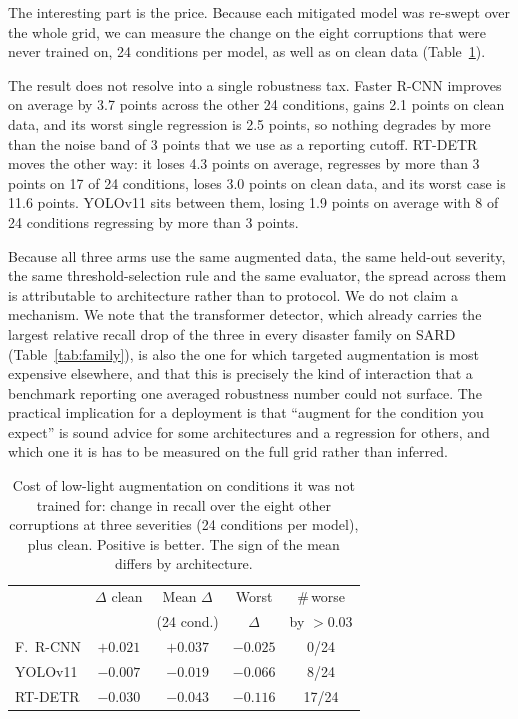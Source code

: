 The interesting part is the price. Because each mitigated model was
re-swept over the whole grid, we can measure the change on the eight
corruptions that were never trained on, 24 conditions per model, as well
as on clean data (Table~\ref{tab:tradeoff}).

The result does not resolve into a single robustness tax. Faster R-CNN
improves on average by 3.7 points across the other 24 conditions, gains
2.1 points on clean data, and its worst single regression is 2.5 points,
so nothing degrades by more than the noise band of 3 points that we use
as a reporting cutoff. RT-DETR moves the other way: it loses 4.3 points
on average, regresses by more than 3 points on 17 of 24 conditions, loses
3.0 points on clean data, and its worst case is 11.6 points. YOLOv11 sits
between them, losing 1.9 points on average with 8 of 24 conditions
regressing by more than 3 points.

Because all three arms use the same augmented data, the same held-out
severity, the same threshold-selection rule and the same evaluator, the
spread across them is attributable to architecture rather than to
protocol. We do not claim a mechanism. We note that the transformer
detector, which already carries the largest relative recall drop of the
three in every disaster family on SARD (Table~\ref{tab:family}), is also
the one for which targeted augmentation is most
expensive elsewhere, and that this is precisely the kind of interaction
that a benchmark reporting one averaged robustness number could not
surface. The practical implication for a deployment is that
``augment for the condition you expect'' is sound advice for some
architectures and a regression for others, and which one it is has to be
measured on the full grid rather than inferred.

\begin{table}[t]
\centering\small
\setlength{\tabcolsep}{3pt}
\caption{Cost of low-light augmentation on conditions it was not trained
for: change in recall over the eight other corruptions at three
severities (24 conditions per model), plus clean. Positive is better.
The sign of the mean differs by architecture.}
\label{tab:tradeoff}
\begin{tabular}{lcccc}
\toprule
 & $\Delta$ clean & Mean $\Delta$ & Worst & \#\,worse \\
 &                & (24 cond.)    & $\Delta$ & by $>$0.03 \\
\midrule
F.\ R-CNN & $+0.021$ & $+0.037$ & $-0.025$ & 0/24 \\
YOLOv11   & $-0.007$ & $-0.019$ & $-0.066$ & 8/24 \\
RT-DETR   & $-0.030$ & $-0.043$ & $-0.116$ & 17/24 \\
\bottomrule
\end{tabular}
\end{table}

